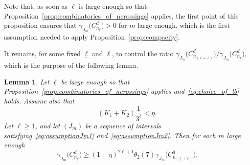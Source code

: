 \documentclass[10pt]{amsart}
\newtheorem{lemm}[theo]{Lemma}\newtheorem{prop}[theo]{Proposition}\newtheorem{coro}[theo]{Corollary}\newtheorem{conj}[theo]{Conjecture}
\theoremstyle{definition}\newtheorem{defi}[theo]{Definition}\newtheorem{rema}[theo]{Remark}\newtheorem{exam}[theo]{Example}\newtheorem{exem}[theo]{Example}\newtheorem{nota}[theo]{Notation}
\newcommand{\cd}{C^{d}}
\newcommand{\lb}{\underline{\ell}}
\begin{document}
Note that, as soon as $\lb$ is large enough so that Proposition~\ref{prop:combinatorics_of_ncrossings} applies, the first point of this proposition ensures that $\gamma_{J_m}\bigl(\cd_{n_{\lb}}\bigr)>0$ for $m$ large enough, which is the first assumption needed to apply Proposition~\ref{prop:compacity}.

It remains, for some fixed $\lb$ and $\ell$, to control the ratio $\gamma_{J_m}\bigl(\cd_{n_{(\lb+\ell)}}\bigr)/\gamma_{J_m}\bigl(\cd_{n_{\lb}}\bigr)$, which is the purpose of the following lemma.

\begin{lemm}\label{lemma:ratio}
Let $\lb$ be large enough so that Proposition~\ref{prop:combinatorics_of_ncrossings} applies and~\eqref{eq:choice_of_lb} holds. Assume also that
\begin{equation}\label{eq:newcondlb}
(K_1+K_2)\frac{1}{3^{\lb}}<\eta.
\end{equation}
Let $\ell\ge1$, and let $(J_m)$ be a sequence of intervals satisfying~\eqref{eq:assumptionJm1} and~\eqref{eq:assumptionJm2}. Then for each $m$ large enough
\[
\gamma_{J_m}\bigl(\cd_{n_{\lb}}\bigr) \ge (1-\eta)^{2\ell+1} \theta_2(7)\gamma_{J_m} \bigl(\cd_{n_{(\lb+\ell)}}\bigr).
\]
\end{lemm}
\end{document}
